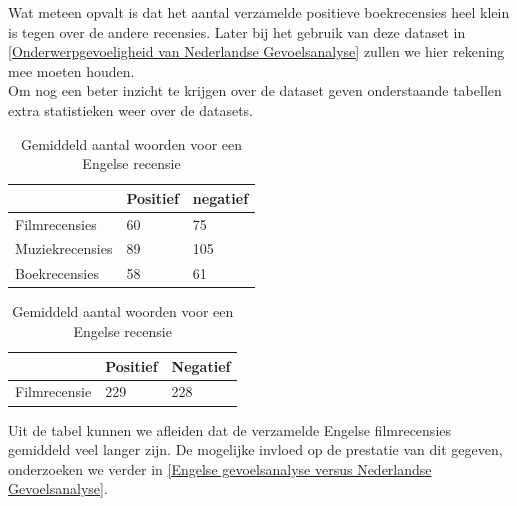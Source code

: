 Wat meteen opvalt is dat het aantal verzamelde positieve boekrecensies heel klein is tegen over de andere recensies. Later bij het gebruik van deze dataset in \ref{Onderwerpgevoeligheid van Nederlandse Gevoelsanalyse} zullen we hier rekening mee moeten houden.\\

Om nog een beter inzicht te krijgen over de dataset geven onderstaande tabellen extra statistieken weer over de datasets.\\

\begin{table}[h]
\centering
\setlength\tabcolsep{2pt}
\begin{minipage}[t]{0.48\textwidth}
\centering

\begin{tabular}{l|l|l|}
\cline{2-3}
                & Positief & negatief \\ \hline
\multicolumn{1}{|l|}{Filmrecensies}   & 60       & 75       \\ \hline
\multicolumn{1}{|l|}{Muziekrecensies} & 89       & 105      \\ \hline
\multicolumn{1}{|l|}{Boekrecensies}   & 58       & 61    \\ \hline   
\end{tabular}

\caption{Gemiddeld aantal woorden voor een Nederlandse recensie} 
\label{tabel: Gemiddeld aantal woorden per recensie Nederlands}
\end{minipage}%
\hfill
\begin{minipage}[t]{0.48\textwidth}
\centering

\begin{tabular}{l|l|l|}
\cline{2-3}
                                   & Positief & Negatief \\ \hline
\multicolumn{1}{|l|}{Filmrecensie} & 229      & 228      \\ \hline
\end{tabular}
\caption{Gemiddeld aantal woorden voor een Engelse recensie}
\label{tabel: Gemiddeld aantal woorden per recensie Engels}
\end{minipage}
\end{table} 

Uit de tabel kunnen we afleiden dat de verzamelde Engelse filmrecensies gemiddeld veel langer zijn. De mogelijke invloed op de prestatie van dit gegeven, onderzoeken we verder in \ref{Engelse gevoelsanalyse versus Nederlandse Gevoelsanalyse}.

